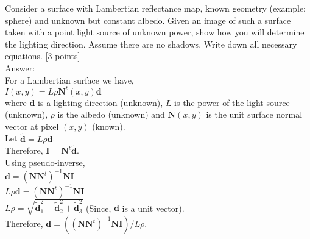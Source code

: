 \documentclass[11pt]{article}
\begin{document}
\maketitle

Consider a surface with Lambertian reflectance map, known geometry (example: sphere) and unknown but constant albedo. Given an image of such a surface taken with a point light source of unknown power, show how you will determine the lighting direction. Assume there are no shadows. Write down all necessary equations. \textsf{[3 points]} \\

Answer: \\

For a Lambertian surface we have, \\
$I(x,y) = L \rho \mathbf{N}^t(x,y) \mathbf{d}$ \\
where $\mathbf{d}$ is a lighting direction (unknown), $L$ is the power of the light source (unknown), $\rho$ is the albedo (unknown) and $\mathbf{N}(x,y)$ is the unit surface normal vector at pixel $(x,y)$ (known). \\
Let $\mathbf{\tilde{d}} = L \rho \mathbf{d}$. \\
Therefore, $\mathbf{I} = \mathbf{N}^t \mathbf{\tilde{d}}$. \\
Using pseudo-inverse, \\
$\mathbf{\tilde{d}} = (\mathbf{NN}^t)^{-1} \mathbf{NI}$ \\
$L \rho \mathbf{d} = (\mathbf{NN}^t)^{-1} \mathbf{NI}$ \\
$L \rho = \sqrt{\mathbf{\tilde{d}}_{1}^{2} + \mathbf{\tilde{d}}_{2}^{2} + \mathbf{\tilde{d}}_{3}^{2}}$ (Since, $\mathbf{d}$ is a unit vector). \\
Therefore, $\mathbf{d} = ((\mathbf{NN}^t)^{-1} \mathbf{NI})/ L \rho$. \\
\end{document}
